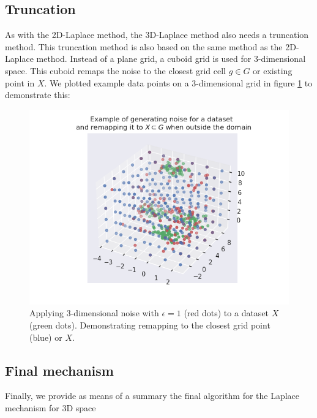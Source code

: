 \subsection{Truncation}
As with the 2D-Laplace method, the 3D-Laplace method also needs a truncation method.
This truncation method is also based on the same method as the 2D-Laplace method.
Instead of a plane grid, a cuboid grid is used for 3-dimensional space.
This cuboid remaps the noise to the closest grid cell $g \in G$ or existing point in $X$.
We plotted example data points on a 3-dimensional grid in figure \ref{fig:3d-laplace-example} to demonstrate this:
\begin{figure} [H]
  \includegraphics[width=\textwidth]{TheorethicalFramework/ND-Laplace/Images/example_3d_laplace.png}
  \caption{Applying 3-dimensional noise with $\epsilon = 1$ (red dots) to a dataset $X$ (green dots). Demonstrating remapping to the closest grid point (blue) or $X$.}
  \label{fig:3d-laplace-example}
\end{figure}

\newpage
\subsection{Final mechanism}
Finally, we provide as means of a summary the final algorithm for the Laplace mechanism for 3D space

\newpage